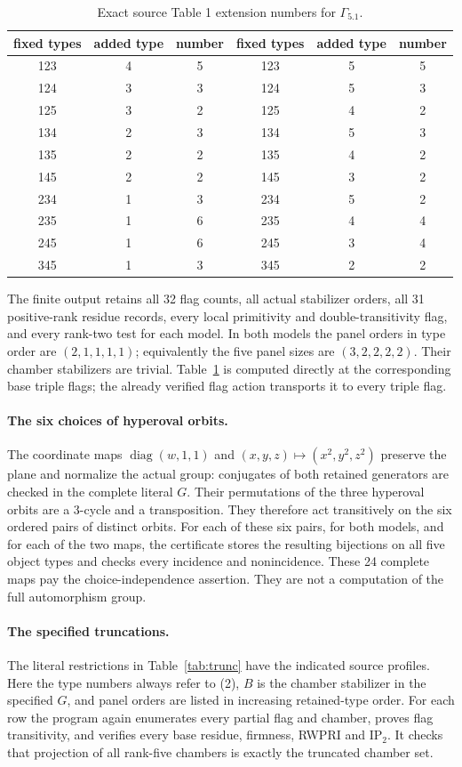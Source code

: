 \documentclass[11pt]{article}
\begin{document}
\begin{table}[t]\centering
\begin{tabular}{ccc@{\qquad}ccc}\toprule
fixed types&added type&number&fixed types&added type&number\\\midrule
123&4&5&123&5&5\\124&3&3&124&5&3\\125&3&2&125&4&2\\
134&2&3&134&5&3\\135&2&2&135&4&2\\145&2&2&145&3&2\\
234&1&3&234&5&2\\235&1&6&235&4&4\\245&1&6&245&3&4\\
345&1&3&345&2&2\\\bottomrule
\end{tabular}
\caption{Exact source Table 1 extension numbers for $\Gamma_{5.1}$.}
\label{tab:ext}\end{table}

The finite output retains all 32 flag counts, all actual stabilizer orders,
all 31 positive-rank residue records, every local primitivity and
double-transitivity flag, and every rank-two test for each model. In both
models the panel orders in type order are $(2,1,1,1,1)$; equivalently the
five panel sizes are $(3,2,2,2,2)$. Their chamber stabilizers are trivial.
Table~\ref{tab:ext} is computed directly at the corresponding base triple
flags; the already verified flag action transports it to every triple flag.

\paragraph{The six choices of hyperoval orbits.}
The coordinate maps $\operatorname{diag}(w,1,1)$ and
$(x,y,z)\mapsto(x^2,y^2,z^2)$ preserve the plane and normalize the actual
group: conjugates of both retained generators are checked in the complete
literal $G$. Their permutations of the three hyperoval orbits are a
3-cycle and a transposition. They therefore act transitively on the six
ordered pairs of distinct orbits. For each of these six pairs, for both
models, and for each of the two maps, the certificate stores the resulting
bijections on all five object types and checks every incidence and
nonincidence. These 24 complete maps pay the choice-independence assertion.
They are not a computation of the full automorphism group.

\paragraph{The specified truncations.}
The literal restrictions in Table~\ref{tab:trunc} have the indicated source
profiles. Here the type numbers always refer to (2), $B$ is the chamber
stabilizer in the specified $G$, and panel orders are listed in increasing
retained-type order. For each row the program again enumerates every partial
flag and chamber, proves flag transitivity, and verifies every base residue,
firmness, RWPRI and $\mathrm{IP}_2$. It checks that projection of all
rank-five chambers is exactly the truncated chamber set.
\end{document}
